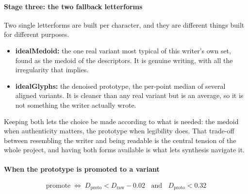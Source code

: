 \paragraph{Stage three: the two fallback letterforms}
Two single letterforms are built per character, and they are different things built for different purposes.


\begin{itemize}\setlength\itemsep{0pt}
  \item \textbf{idealMedoid:} the one real variant most typical of this writer's own set, found as the medoid of the descriptors. It is genuine writing, with all the irregularity that implies.
  \item \textbf{idealGlyphs:} the denoised prototype, the per-point median of several aligned variants. It is cleaner than any real variant but is an average, so it is not something the writer actually wrote.
\end{itemize}
Keeping both lets the choice be made according to what is needed: the medoid when authenticity matters, the prototype when legibility does. That trade-off between resembling the writer and being readable is the central tension of the whole project, and having both forms available is what lets synthesis navigate it.


\paragraph{When the prototype is promoted to a variant}

\begin{equation}
\mathrm{promote} \;\Longleftrightarrow\; D_{\mathrm{proto}} < D_{\mathrm{raw}} - 0.02 \;\;\text{ and }\;\; D_{\mathrm{proto}} < 0.32
\end{equation}

